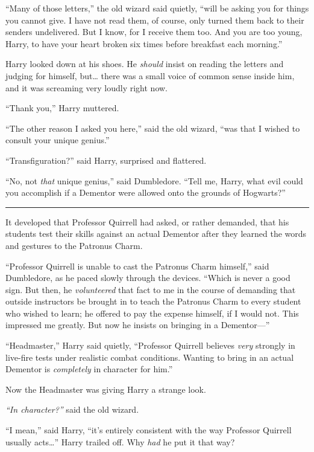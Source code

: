``Many of those letters,'' the old wizard said quietly, ``will be asking
you for things you cannot give. I have not read them, of course, only
turned them back to their senders undelivered. But I know, for I receive
them too. And you are too young, Harry, to have your heart broken six
times before breakfast each morning.''

Harry looked down at his shoes. He \emph{should} insist on reading the
letters and judging for himself, but\ldots{} there was a small voice of
common sense inside him, and it was screaming very loudly right now.

``Thank you,'' Harry muttered.

``The other reason I asked you here,'' said the old wizard, ``was that I
wished to consult your unique genius.''

``Transfiguration?'' said Harry, surprised and flattered.

``No, not \emph{that} unique genius,'' said Dumbledore. ``Tell me,
Harry, what evil could you accomplish if a Dementor were allowed onto
the grounds of Hogwarts?''

\begin{center}\rule{3in}{0.4pt}\end{center}

It developed that Professor Quirrell had asked, or rather demanded, that
his students test their skills against an actual Dementor after they
learned the words and gestures to the Patronus Charm.

``Professor Quirrell is unable to cast the Patronus Charm himself,''
said Dumbledore, as he paced slowly through the devices. ``Which is
never a good sign. But then, he \emph{volunteered} that fact to me in
the course of demanding that outside instructors be brought in to teach
the Patronus Charm to every student who wished to learn; he offered to
pay the expense himself, if I would not. This impressed me greatly. But
now he insists on bringing in a Dementor---''

``Headmaster,'' Harry said quietly, ``Professor Quirrell believes
\emph{very} strongly in live-fire tests under realistic combat
conditions. Wanting to bring in an actual Dementor is \emph{completely}
in character for him.''

Now the Headmaster was giving Harry a strange look.

\emph{``In character?''} said the old wizard.

``I mean,'' said Harry, ``it's entirely consistent with the way
Professor Quirrell usually acts\ldots{}'' Harry trailed off. Why
\emph{had} he put it that way?

